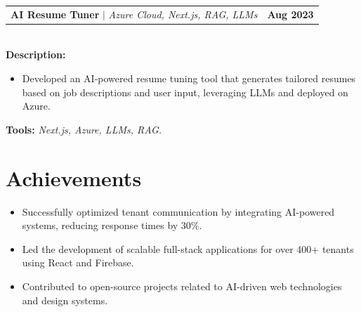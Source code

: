 \documentclass[letterpaper,11pt]{article}
\makeatletter
\newcommand{\resumeItem}[1]{
  \item\small{
    {#1 \vspace{-2pt}}
  }
}
\newcommand{\resumeProjectHeading}[2]{
    \item
    \begin{tabular*}{1.001\textwidth}{l@{\extracolsep{\fill}}r}
      \small#1 & \textbf{\small #2}\\
    \end{tabular*}\vspace{-7pt}
}
\newcommand{\resumeItemListStart}{\begin{itemize}}
\newcommand{\resumeItemListEnd}{\end{itemize}\vspace{-5pt}}
\makeatother
\begin{document}
\resumeProjectHeading
{\textbf{AI Resume Tuner} $|$ \emph{Azure Cloud, Next.js, RAG, LLMs}}{Aug 2023}\\
\vspace{6pt}
\textbf{Description:}
\vspace{-5pt}
\resumeItemListStart
\resumeItem{Developed an AI-powered resume tuning tool that generates tailored resumes based on job descriptions and user input, leveraging LLMs and deployed on Azure.}
\resumeItemListEnd
\vspace{4pt}
\textbf{Tools:} \emph{Next.js, Azure, LLMs, RAG.}

\section{Achievements}
\begin{itemize}
\item Successfully optimized tenant communication by integrating AI-powered systems, reducing response times by 30\%.
\item Led the development of scalable full-stack applications for over 400+ tenants using React and Firebase.
\item Contributed to open-source projects related to AI-driven web technologies and design systems.
\end{itemize}

\vspace{10pt}
\end{document}
